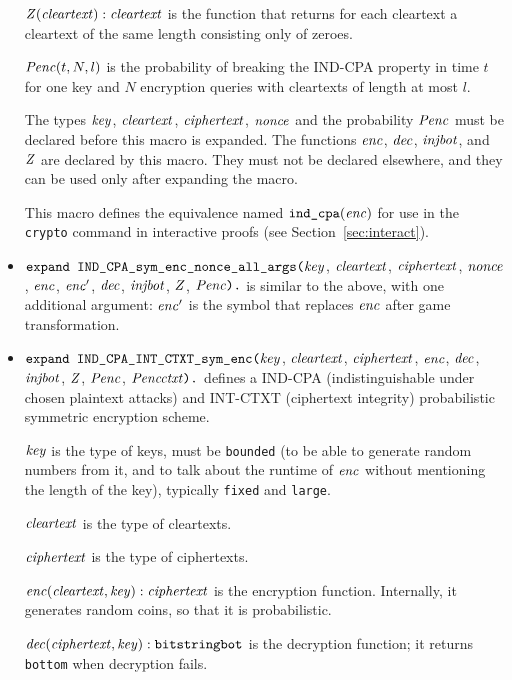 \documentclass{article}
\begin{document}
\begin{itemize}
   $\mathit{Z}(\mathit{cleartext}): \mathit{cleartext}$ is the function that
  returns for each cleartext a cleartext of the same length consisting
  only of zeroes.

  $\mathit{Penc}(t, N, l)$ is the probability of breaking the IND-CPA
  property in time $t$ for one key and $N$ encryption queries with
  cleartexts of length at most $l$.

   The types $\mathit{key}$, $\mathit{cleartext}$,
   $\mathit{ciphertext}$, $\mathit{nonce}$ and the probability $\mathit{Penc}$ must
   be declared before this macro is expanded. The functions
   $\mathit{enc}$, $\mathit{dec}$, $\mathit{injbot}$, and $\mathit{Z}$ are declared by this
   macro. They must not be declared elsewhere, and they can be used
   only after expanding the macro.

   This macro defines the equivalence named $\texttt{ind\_cpa}(\mathit{enc})$
   for use in the \texttt{crypto} command in interactive proofs
   (see Section~\ref{sec:interact}).

\item $\texttt{expand IND\_CPA\_sym\_enc\_nonce\_all\_args(}\mathit{key}$,
  $\mathit{cleartext}$, $\mathit{ciphertext}$, $\mathit{nonce}$, $\mathit{enc}$, $\mathit{enc}'$,
  $\mathit{dec}$, $\mathit{injbot}$, $\mathit{Z}$, $\mathit{Penc}\texttt{).}$ is similar to the above,
  with one additional argument: $\mathit{enc}'$ is the symbol that replaces $\mathit{enc}$ after game transformation.

\item $\texttt{expand IND\_CPA\_INT\_CTXT\_sym\_enc(}\mathit{key}$,
  $\mathit{cleartext}$, $\mathit{ciphertext}$, $\mathit{enc}$,
  $\mathit{dec}$, $\mathit{injbot}$, $\mathit{Z}$, $\mathit{Penc}$, $\mathit{Pencctxt}\texttt{).}$ defines a
  IND-CPA (indistinguishable under chosen plaintext attacks) and INT-CTXT (ciphertext integrity)
  probabilistic symmetric encryption scheme.

   $\mathit{key}$ is the type of keys, must be \texttt{bounded} (to be able to generate random numbers from it, and to talk about the runtime of $\mathit{enc}$ without mentioning the length of the key), typically \texttt{fixed} and \texttt{large}.

   $\mathit{cleartext}$ is the type of cleartexts.

   $\mathit{ciphertext}$ is the type of ciphertexts.

   $\mathit{enc}(\mathit{cleartext}, \mathit{key}): \mathit{ciphertext}$ is the encryption function. Internally, it generates random coins, so that it is probabilistic.

   $\mathit{dec}(\mathit{ciphertext}, \mathit{key}): \texttt{bitstringbot}$ is the
  decryption function; it returns \texttt{bottom} when decryption
  fails.


\end{itemize}
\end{document}
